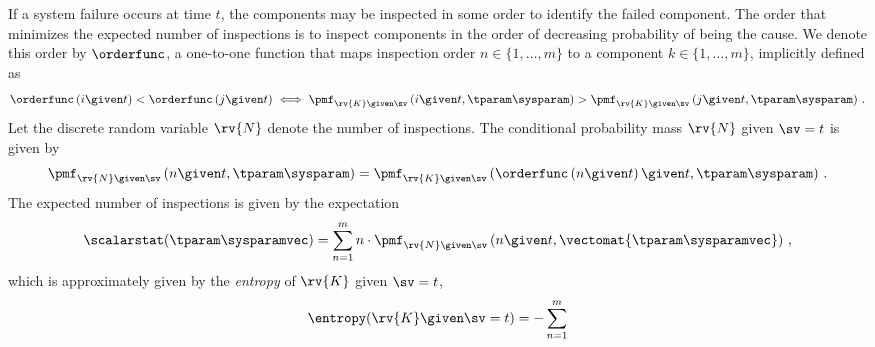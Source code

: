 \documentclass[hidelinks,11pt]{article}
\begin{document}
If a system failure occurs at time $t$, the components may be inspected in some order to identify the failed component. The order that minimizes the expected number of inspections is to inspect components in the order of decreasing probability of being the cause. We denote this order by $\orderfunc$, a one-to-one function that maps inspection order $n \in \{1, \ldots, m\}$ to a component $k \in \{1, \ldots, m\}$, implicitly defined as
\begin{equation}
\orderfunc \left(i \given t\right) < \orderfunc\left(j \given t\right) \iff \pmf_{\rv{K} \given \sv}\left(i \given t, \tparam\sysparam\right) > \pmf_{\rv{K} \given \sv}\left(j \given t, \tparam\sysparam\right)\,.
\end{equation}
Let the discrete random variable $\rv{N}$ denote the number of inspections. The conditional probability mass $\rv{N}$ given $\sv = t$ is given by
\begin{equation}
\label{eq:expo_P_N_sigma}
    \pmf_{\rv{N} \given \sv}\left(n \given t, \tparam\sysparam\right) =
    \pmf_{\rv{K} \given \sv}\left(\orderfunc \left(n \given t \right) \given t, \tparam\sysparam \right)\,.
\end{equation}
The expected number of inspections is given by the expectation
\begin{equation}
\scalarstat(\tparam\sysparamvec) = \sum_{n=1}^{m} n \cdot \pmf_{\rv{N} \given \sv}\left(n \given t, \vectomat{\tparam\sysparamvec}\right)\,,
\end{equation}
which is approximately given by the \emph{entropy} of $\rv{K}$ given $\sv = t$,
\begin{equation}
    \entropy(\rv{K} \given \sv = t) = -\sum_{n=1}^{m} 
\end{equation}
\end{document}
